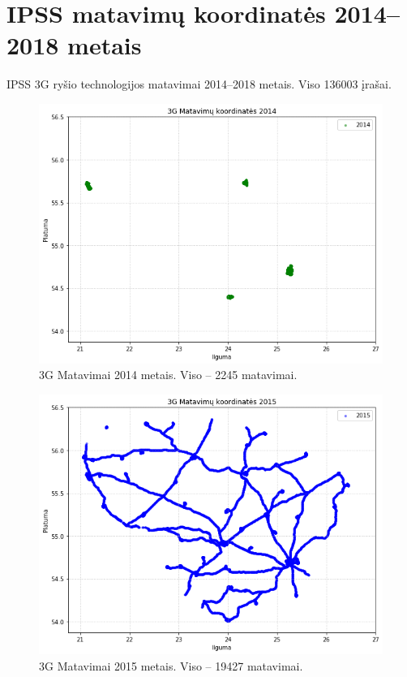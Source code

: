 \documentclass{VUMIFPSbakalaurinis}
\begin{document}
\section{IPSS matavimų koordinatės 2014–2018 metais} \label{coordpav}
IPSS 3G ryšio technologijos matavimai 2014–2018 metais. Viso 136003 įrašai.
\begin{figure}[H]
	\centering
	\includegraphics[scale=0.33]{img/3G-1}
	\caption{3G Matavimai 2014 metais. Viso – 2245 matavimai.}
	\label{img:3G-1}
\end{figure}
\begin{figure}[H]
	\centering
	\includegraphics[scale=0.33]{img/3G-2}
	\caption{3G Matavimai 2015 metais. Viso – 19427 matavimai.}
	\label{img:3G-2}
\end{figure}
\end{document}
